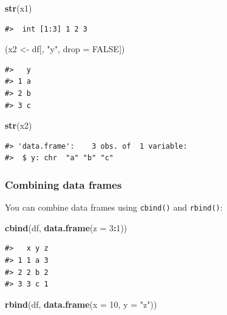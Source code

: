 \documentclass[]{book}
\newenvironment{Shaded}{\begin{snugshade}}{\end{snugshade}}
\newcommand{\KeywordTok}[1]{\textcolor[rgb]{0.13,0.29,0.53}{\textbf{#1}}}
\newcommand{\DataTypeTok}[1]{\textcolor[rgb]{0.13,0.29,0.53}{#1}}
\newcommand{\DecValTok}[1]{\textcolor[rgb]{0.00,0.00,0.81}{#1}}
\newcommand{\StringTok}[1]{\textcolor[rgb]{0.31,0.60,0.02}{#1}}
\newcommand{\OtherTok}[1]{\textcolor[rgb]{0.56,0.35,0.01}{#1}}
\newcommand{\OperatorTok}[1]{\textcolor[rgb]{0.81,0.36,0.00}{\textbf{#1}}}
\newcommand{\NormalTok}[1]{#1}
\theoremstyle{definition}
\theoremstyle{definition}
\theoremstyle{definition}
\theoremstyle{remark}
\begin{document}
\begin{Shaded}
\begin{Highlighting}[]
\KeywordTok{str}\NormalTok{(x1)}
\end{Highlighting}
\end{Shaded}

\begin{verbatim}
#>  int [1:3] 1 2 3
\end{verbatim}

\begin{Shaded}
\begin{Highlighting}[]
\NormalTok{(x2 <-}\StringTok{ }\NormalTok{df[, }\StringTok{"y"}\NormalTok{, }\DataTypeTok{drop =} \OtherTok{FALSE}\NormalTok{])}
\end{Highlighting}
\end{Shaded}

\begin{verbatim}
#>   y
#> 1 a
#> 2 b
#> 3 c
\end{verbatim}

\begin{Shaded}
\begin{Highlighting}[]
\KeywordTok{str}\NormalTok{(x2)}
\end{Highlighting}
\end{Shaded}

\begin{verbatim}
#> 'data.frame':    3 obs. of  1 variable:
#>  $ y: chr  "a" "b" "c"
\end{verbatim}

\subsubsection{Combining data frames}\label{combining-data-frames}

You can combine data frames using \texttt{cbind()} and \texttt{rbind()}:

\begin{Shaded}
\begin{Highlighting}[]
\KeywordTok{cbind}\NormalTok{(df, }\KeywordTok{data.frame}\NormalTok{(}\DataTypeTok{z =} \DecValTok{3}\OperatorTok{:}\DecValTok{1}\NormalTok{))}
\end{Highlighting}
\end{Shaded}

\begin{verbatim}
#>   x y z
#> 1 1 a 3
#> 2 2 b 2
#> 3 3 c 1
\end{verbatim}

\begin{Shaded}
\begin{Highlighting}[]
\KeywordTok{rbind}\NormalTok{(df, }\KeywordTok{data.frame}\NormalTok{(}\DataTypeTok{x =} \DecValTok{10}\NormalTok{, }\DataTypeTok{y =} \StringTok{"z"}\NormalTok{))}
\end{Highlighting}
\end{Shaded}
\end{document}
